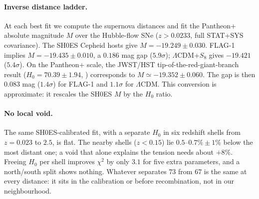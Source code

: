 \documentclass[11pt]{article}
\begin{document}
\paragraph{Inverse distance ladder.} At each best fit we compute the supernova distances and fit the Pantheon+ absolute
magnitude $M$ over the Hubble-flow SNe ($z>0.0233$, full STAT+SYS covariance). The SH0ES Cepheid hosts give
$M=-19.249\pm0.030$. FLAG-1 implies $M=-19.435\pm0.010$, a $0.186$ mag gap ($5.9\sigma$); $\Lambda$CDM+$S_8$ gives
$-19.421$ ($5.4\sigma$). On the Pantheon+ scale, the JWST/HST tip-of-the-red-giant-branch result ($H_0=70.39\pm1.94$,
\cite{freedman2025}) corresponds to $M\simeq-19.352\pm0.060$. The gap is then $0.083$ mag ($1.4\sigma$) for FLAG-1 and
$1.1\sigma$ for $\Lambda$CDM. This conversion is approximate: it rescales the SH0ES $M$ by the $H_0$ ratio.
\paragraph{No local void.} The same SH0ES-calibrated fit, with a separate $H_0$ in six redshift shells from $z=0.023$ to
$2.5$, is flat. The nearby shells ($z<0.15$) lie $0.5$--$0.7\%\pm1\%$ below the most distant one; a void that alone
explains the tension needs about $+8\%$. Freeing $H_0$ per shell improves $\chi^2$ by only $3.1$ for five extra
parameters, and a north/south split shows nothing. Whatever separates $73$ from $67$ is the same at every distance: it
sits in the calibration or before recombination, not in our neighbourhood.
\end{document}
